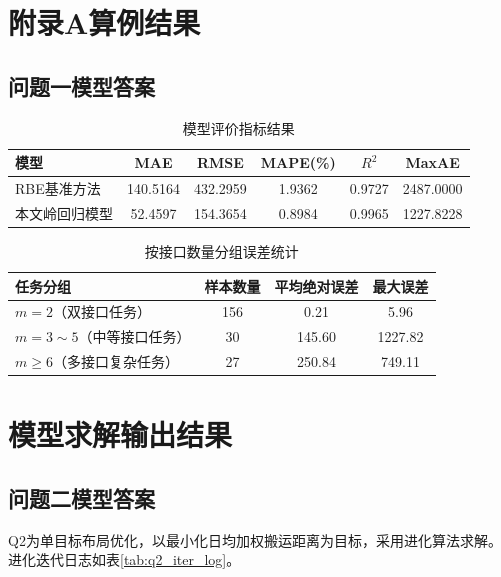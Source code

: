 \documentclass[12pt,a4paper]{article}
\begin{document}
	\appendix
	\section{附录A算例结果}
	\subsection{问题一模型答案}
	\begin{table}[htbp]
		\centering
		\caption{模型评价指标结果}
		\begin{tabular}{lccccc}
			\hline
			模型 & MAE & RMSE & MAPE(\%) & $R^2$ & MaxAE \\
			\hline
			RBE基准方法 & 140.5164 & 432.2959 & 1.9362 & 0.9727 & 2487.0000 \\
			本文岭回归模型 & 52.4597 & 154.3654 & 0.8984 & 0.9965 & 1227.8228 \\
			\hline
		\end{tabular}
	\end{table}
	
	\begin{table}[htbp]
		\centering
		\caption{按接口数量分组误差统计}
		\begin{tabular}{lccc}
			\hline
			任务分组 & 样本数量 & 平均绝对误差 & 最大误差 \\
			\hline
			$m=2$（双接口任务） & 156 & 0.21 & 5.96 \\
			$m=3\sim5$（中等接口任务） & 30 & 145.60 & 1227.82 \\
			$m\ge6$（多接口复杂任务） & 27 & 250.84 & 749.11 \\
			\hline
		\end{tabular}
	\end{table}
	
\appendix
\section{模型求解输出结果}

\subsection{问题二模型答案}
Q2为单目标布局优化，以最小化日均加权搬运距离为目标，采用进化算法求解。进化迭代日志如表\ref{tab:q2_iter_log}。
\end{document}

